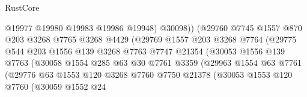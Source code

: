 \begin{lexlean}{RustCore}
\begin{coremodule}
                                    @19977
                                    @19980
                                    @19983
                                    @19986
                                    @19948)
                                  @30098))
                              (@29760
                                @7745
                                @1557
                                @870
                                @203
                                @3268
                                @7765
                                @3268
                                @4429
                                (@29769
                                  @1557
                                  @203
                                  @3268
                                  @7764
                                  (@29775
                                    @544
                                    @203
                                    @1556
                                    @139
                                    @3268
                                    @7763
                                    @7747
                                    @21354
                                    (@30053
                                      @1556
                                      @139
                                      @7763
                                      (@30058
                                        @1554
                                        @285
                                        @63
                                        @30
                                        @7761
                                        @3359
                                        (@29963
                                          @1554
                                          @63
                                          @7761
                                          (@29776
                                            @63
                                            @1553
                                            @120
                                            @3268
                                            @7760
                                            @7750
                                            @21378
                                            (@30053
                                              @1553
                                              @120
                                              @7760
                                              (@30059
                                                @1552
                                                @24

\end{coremodule}
\end{lexlean}
